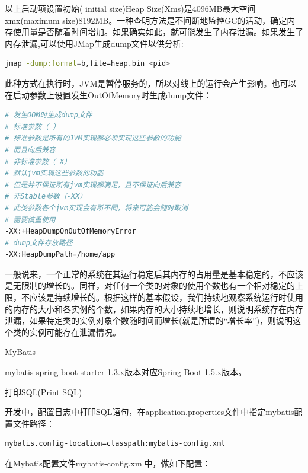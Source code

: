 \documentclass[12pt]{book}
\makeatletter
\numberwithin{dummy}{section}
\theoremstyle{ocrenumbox}
\theoremstyle{blacknumex}
\theoremstyle{blacknumbox}
\theoremstyle{ocrenum}
\renewcommand{\section}{\@startsection{section}{1}{\z@}
	{-4ex \@plus -1ex \@minus -.4ex}
	{1ex \@plus.2ex }
	{\normalfont\large\sffamily\bfseries}}
\renewcommand{\subsection}{\@startsection {subsection}{2}{\z@}
	{-3ex \@plus -0.1ex \@minus -.4ex}
	{0.5ex \@plus.2ex }
	{\normalfont\sffamily\bfseries}}
\makeatother
\begin{document}
以上启动项设置初始( initial size)Heap Size(Xms)是4096MB最大空间xmx(maximum size)8192MB。一种查明方法是不间断地监控GC的活动，确定内存使用量是否随着时间增加。如果确实如此，就可能发生了内存泄漏。如果发生了内存泄漏,可以使用JMap生成dump文件以供分析:

\begin{lstlisting}[language=Bash]
jmap -dump:format=b,file=heap.bin <pid> 
\end{lstlisting}

此种方式在执行时，JVM是暂停服务的，所以对线上的运行会产生影响。也可以在启动参数上设置发生OutOfMemory时生成dump文件：

\begin{lstlisting}[language=Bash]
# 发生OOM时生成dump文件
# 标准参数（-）
# 标准参数是所有的JVM实现都必须实现这些参数的功能
# 而且向后兼容
# 非标准参数（-X）
# 默认jvm实现这些参数的功能
# 但是并不保证所有jvm实现都满足，且不保证向后兼容
# 非Stable参数（-XX）
# 此类参数各个jvm实现会有所不同，将来可能会随时取消
# 需要慎重使用
-XX:+HeapDumpOnOutOfMemoryError
# dump文件存放路径
-XX:HeapDumpPath=/home/app
\end{lstlisting}

一般说来，一个正常的系统在其运行稳定后其内存的占用量是基本稳定的，不应该是无限制的增长的。同样，对任何一个类的对象的使用个数也有一个相对稳定的上限，不应该是持续增长的。根据这样的基本假设，我们持续地观察系统运行时使用的内存的大小和各实例的个数，如果内存的大小持续地增长，则说明系统存在内存泄漏，如果特定类的实例对象个数随时间而增长(就是所谓的“增长率”)，则说明这个类的实例可能存在泄漏情况。

\section{MyBatis}

mybatis-spring-boot-starter 1.3.x版本对应Spring Boot 1.5.x版本。


\subsection{打印SQL(Print SQL)}

开发中，配置日志中打印SQL语句，在application.properties文件中指定mybatis配置文件路径：

\begin{lstlisting}[language=Bash]
mybatis.config-location=classpath:mybatis-config.xml
\end{lstlisting}

在Mybatis配置文件mybatis-config.xml中，做如下配置：
\end{document}

